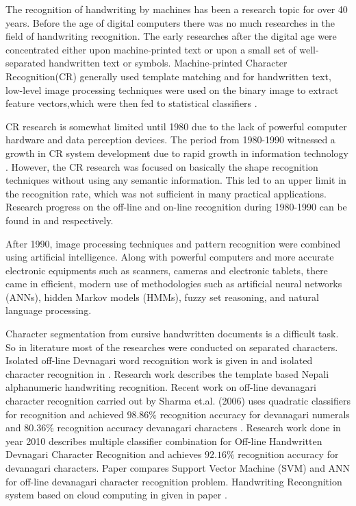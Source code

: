 \documentclass[12pt,a4paper,oneside]{article}
\numberwithin{equation}{section}
\numberwithin{algorithm}{section}
\begin{document}
	The recognition of handwriting by machines has been a research topic for over 40 years. Before the age of digital computers there was no much researches in the field of handwriting recognition. The early researches after the digital age were concentrated either upon machine-printed text or upon a small set of well-separated handwritten text or symbols. Machine-printed Character Recognition(CR) generally used template matching and for handwritten text, low-level image processing techniques were used on the binary image to extract feature vectors,which were then fed to statistical classifiers \cite{Suen1980}.
	
	CR research is somewhat limited until 1980 due to the lack of powerful computer hardware and data perception devices. The period from 1980-1990 witnessed a growth in CR system development \cite{Govindan1990} due to rapid growth in information technology \cite{Bozinovic1989}. However, the CR research was focused on basically the shape recognition techniques without using any semantic information. This led to an upper limit in the recognition rate, which was not sufficient in many practical applications. Research progress on the off-line and on-line recognition during 1980-1990 can be found in \cite{Suen1992} and \cite{Suen1990} respectively.
	
	After 1990, image processing techniques and pattern recognition were combined using artificial intelligence. Along with powerful computers and more accurate electronic equipments such as scanners, cameras and electronic tablets, there came in efficient, modern use of methodologies such as artificial neural networks (ANNs), hidden Markov models (HMMs), fuzzy set reasoning, and natural language processing.
	
	Character segmentation from cursive handwritten documents is a difficult task. So in literature most of the researches were conducted on separated characters. Isolated off-line Devnagari word recognition work is given in \cite{Shaw2008} and isolated character recognition in \cite{Sandhya2008}. Research work \cite{Santosh2007} describes the template based Nepali alphanumeric handwriting recognition. Recent work on off-line devanagari character recognition carried out by Sharma et.al. (2006) uses quadratic classifiers for recognition and achieved $98.86\%$ recognition accuracy for devanagari numerals and $80.36\%$ recognition accuracy devanagari characters \cite{Sharma2006}. Research work \cite{Sandhya2010} done in year 2010 describes multiple classifier combination for Off-line Handwritten Devnagari Character Recognition and achieves $92.16\%$ recognition accuracy for devanagari characters. Paper \cite{Sandhya2010_1} compares Support Vector Machine (SVM) and ANN for off-line devanagari character recognition problem. Handwriting Recongnition system based on cloud computing in given in paper \cite{Yan2011}.
	
\end{document}
